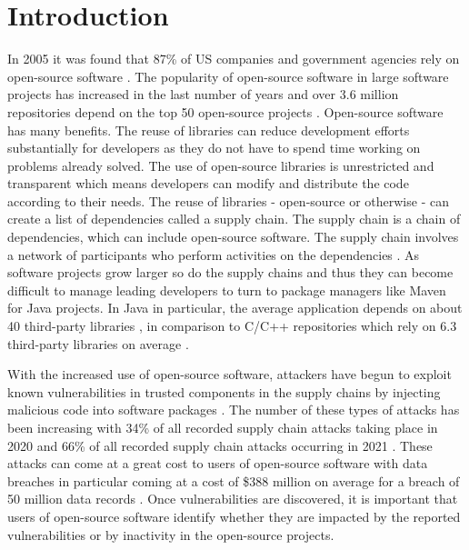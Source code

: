 \documentclass[conference]{IEEEtran}
\begin{document}
\section{Introduction}
In 2005 it was found that 87\% of US companies and government agencies rely on open-source software \cite{i_ceh_analysis_2021}. The popularity of open-source software in large software projects has increased in the last number of years \cite{zajdel_open_2022} and over 3.6 million repositories depend on the top 50 open-source projects \cite{subramanian_empirical_2020}. Open-source software has many benefits. The reuse of libraries can reduce development efforts substantially for developers as they do not have to spend time working on problems already solved. The use of open-source libraries is unrestricted and transparent which means developers can modify and distribute the code according to their needs. The reuse of libraries - open-source or otherwise - can create a list of dependencies called a supply chain. The supply chain is a chain of dependencies, which can include open-source software. The supply chain involves a network of participants who perform activities on the dependencies \cite{k_singi_trusted_2019}. As software projects grow larger so do the supply chains and thus they can become difficult to manage leading developers to turn to package managers like Maven for Java projects. In Java in particular, the average application depends on about 40 third-party libraries \cite{a_m_mir_effect_2023}, in comparison to C/C++ repositories which rely on 6.3 third-party libraries on average \cite{tang_towards_2023}.

With the increased use of open-source software, attackers have begun to exploit known vulnerabilities in trusted components in the supply chains by injecting malicious code into software packages \cite{ohm_backstabbers_2020}. The number of these types of attacks has been increasing with 34\% of all recorded supply chain attacks taking place in 2020 and 66\% of all recorded supply chain attacks occurring in 2021 \cite{m_z_malik_protection_2023}. These attacks can come at a great cost to users of open-source software with data breaches in particular coming at a cost of \$388 million on average for a breach of 50 million data records \cite{x_wang_feasibility_2021}. Once vulnerabilities are discovered, it is important that users of open-source software identify whether they are impacted by the reported vulnerabilities or by inactivity in the open-source projects. 
\end{document}
